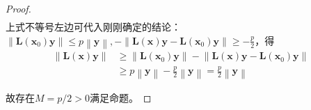 \documentclass[main.tex]{subfiles}
\begin{document}
\begin{proof}
\begin{align*}
    \end{align*}
    上式不等号左边可代入刚刚确定的结论：$\left\|\mathbf{L}\left(\mathbf{x}_0\right)\mathbf{y}\right\|\leq p\left\|\mathbf{y}\right\|, -\left\|\mathbf{L}\left(\mathbf{x}\right)\mathbf{y}-\mathbf{L}\left(\mathbf{x}_0\right)\mathbf{y}\right\|\geq-\frac{p}{2}$，得
    \begin{align*}
        \left\|\mathbf{L}\left(\mathbf{x}\right)\mathbf{y}\right\| & \geq\left\|\mathbf{L}\left(\mathbf{x}_0\right)\mathbf{y}\right\|-\left\|\mathbf{L}\left(\mathbf{x}\right)\mathbf{y}-\mathbf{L}\left(\mathbf{x}_0\right)\mathbf{y}\right\| \\
                                                                   & \geq p\left\|\mathbf{y}\right\|-\frac{p}{2}\left\|\mathbf{y}\right\|=\frac{p}{2}\left\|\mathbf{y}\right\|
    \end{align*}

    故存在$M=p/2>0$满足命题。
\end{proof}
\end{document}
